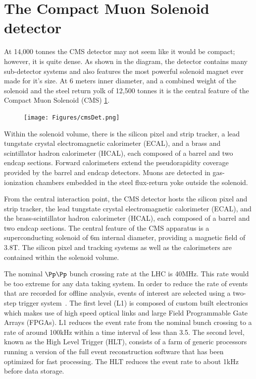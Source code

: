 \section{The Compact Muon Solenoid detector}
At 14,000 tonnes the CMS detector may not seem like it would be compact; however, it is quite dense. As shown in the diagram, the detector contains many sub-detector systems and also features the most powerful solenoid magnet ever made for it's size. At 6 meters inner diameter, and a combined weight of the solenoid and the steel return yolk of 12,500 tonnes it is the central feature of the Compact Muon Solenoid (CMS) \ref{fig:cmsdet}.
\begin{figure}[!htb]
\begin{center}
\texttt{[image: Figures/cmsDet.png]}
\label{fig:cmsdet}
\end{center}
\end{figure}
 Within the solenoid volume, there is the
silicon pixel and strip tracker, a lead tungstate crystal 
electromagnetic calorimeter (ECAL), and a brass and scintillator 
hadron calorimeter (HCAL), each composed of a barrel and two endcap 
sections. Forward calorimeters extend the pseudorapidity 
coverage provided by the barrel and endcap detectors. 
Muons are detected in gas-ionization chambers embedded 
in the steel flux-return yoke outside the solenoid.

From the central interaction point, the CMS detector hosts
the silicon pixel and strip tracker, the lead tungstate crystal electromagnetic
calorimeter (ECAL), and the brass-scintillator hadron calorimeter (HCAL),
each composed of a barrel and two endcap sections. The central feature of
the CMS apparatus is a superconducting solenoid of 6\unit{m} internal diameter, providing
a magnetic field of 3.8\unit{T}. The silicon pixel and tracking systems as well as
the calorimeters are contained within the solenoid volume.  %

The nominal $\Pp\Pp$ bunch crossing rate at the LHC is 40\unit{MHz}. This rate would be too extreme for any data taking system. In order to reduce the rate of events that are recorded for offline analysis, events of interest are selected using a two-step trigger system~\cite{Khachatryan:2016bia}.
The first level (L1) is composed of custom built electronics which makes use of
high speed optical links and large Field Programmable Gate Arrays (FPGAs). 
L1 reduces the event rate from the nominal bunch crossing to a rate of around
100\unit{kHz} within a time interval of less than 3.5\mus.
The second level, known as the High Level Trigger (HLT), consists of a farm of 
generic processors running a version of the full event reconstruction software that
 has been optimized for fast processing. The HLT reduces the event rate to about
1\unit{kHz} before data storage.

